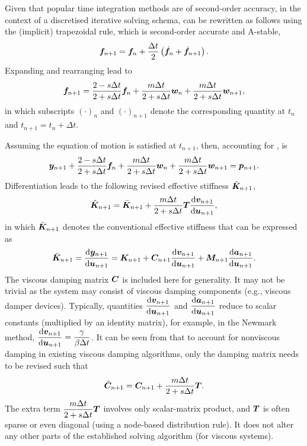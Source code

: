Given that popular time integration methods are of second-order accuracy, in the context of a discretised iterative solving schema,  can be rewritten as follows using the (implicit) trapezoidal rule, which is second-order accurate and A-stable,
\begin{gather}
\bm{f}_{n+1}=\bm{f}_n+\dfrac{\Delta{}t}{2}\left(\dot{\bm{f}}_n+\dot{\bm{f}}_{n+1}\right).
\end{gather}
Expanding and rearranging lead to
\begin{gather}\label{eq:discretised_c}
\bm{f}_{n+1}=\dfrac{2-s\Delta{}t}{2+s\Delta{}t}\bm{f}_n+\dfrac{m\Delta{}t}{2+s\Delta{}t}\bm{w}_n+\dfrac{m\Delta{}t}{2+s\Delta{}t}\bm{w}_{n+1},
\end{gather}
in which subscripts $\left(\cdot\right)_n$ and $\left(\cdot\right)_{n+1}$ denote the corresponding quantity at $t_n$ and $t_{n+1}=t_n+\Delta{}t$.

Assuming the equation of motion  is satisfied at $t_{n+1}$, then, accounting for ,  is
\begin{gather}\label{eq:residual}
\bm{y}_{n+1}+\dfrac{2-s\Delta{}t}{2+s\Delta{}t}\bm{f}_n+\dfrac{m\Delta{}t}{2+s\Delta{}t}\bm{w}_n+\dfrac{m\Delta{}t}{2+s\Delta{}t}\bm{w}_{n+1}=\bm{p}_{n+1}.
\end{gather}
Differentiation leads to the following revised effective stiffness $\hat{\bm{K}}_{n+1}$,
\begin{gather}\label{eq:revised_k}
\hat{\bm{K}}_{n+1}=\bar{\bm{K}}_{n+1}+\dfrac{m\Delta{}t}{2+s\Delta{}t}\bm{T}\dfrac{\mathrm{d}\bm{v}_{n+1}}{\mathrm{d}\bm{u}_{n+1}},
\end{gather}
in which $\bar{\bm{K}}_{n+1}$ denotes the conventional effective stiffness that can be expressed as
\begin{gather}
\bar{\bm{K}}_{n+1}=\dfrac{\mathrm{d}\bm{y}_{n+1}}{\mathrm{d}\bm{u}_{n+1}}=\bm{K}_{n+1}+\bm{C}_{n+1}\dfrac{\mathrm{d}\bm{v}_{n+1}}{\mathrm{d}\bm{u}_{n+1}}+\bm{M}_{n+1}\dfrac{\mathrm{d}\bm{a}_{n+1}}{\mathrm{d}\bm{u}_{n+1}}.
\end{gather}
The viscous damping matrix $\bm{C}$ is included here for generality. It may not be trivial as the system may consist of viscous damping components (e.g., viscous damper devices). Typically, quantities $\dfrac{\mathrm{d}\bm{v}_{n+1}}{\mathrm{d}\bm{u}_{n+1}}$ and $\dfrac{\mathrm{d}\bm{a}_{n+1}}{\mathrm{d}\bm{u}_{n+1}}$ reduce to scalar constants (multiplied by an identity matrix), for example, in the Newmark method, $\dfrac{\mathrm{d}\bm{v}_{n+1}}{\mathrm{d}\bm{u}_{n+1}}=\dfrac{\gamma}{\beta\Delta{}t}$. It can be seen from  that to account for nonviscous damping in existing viscous damping algorithms, only the damping matrix needs to be revised such that
\begin{gather}
\hat{\bm{C}}_{n+1}=\bm{C}_{n+1}+\dfrac{m\Delta{}t}{2+s\Delta{}t}\bm{T}.
\end{gather}
The extra term $\dfrac{m\Delta{}t}{2+s\Delta{}t}\bm{T}$ involves only scalar-matrix product, and $\bm{T}$ is often sparse or even diagonal (using a node-based distribution rule). It does not alter any other parts of the established solving algorithm (for viscous systems).

